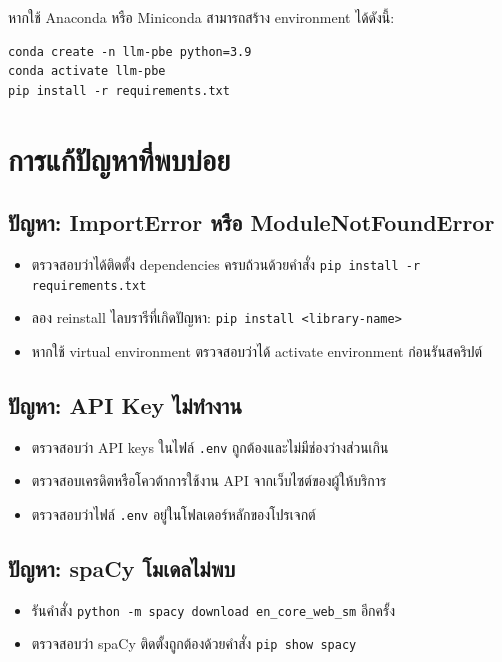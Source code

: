 หากใช้ Anaconda หรือ Miniconda สามารถสร้าง environment ได้ดังนี้:

\begin{lstlisting}[style=bash]
conda create -n llm-pbe python=3.9
conda activate llm-pbe
pip install -r requirements.txt
\end{lstlisting}

\section{การแก้ปัญหาที่พบบ่อย}
\label{sec:troubleshooting}

\subsection{ปัญหา: ImportError หรือ ModuleNotFoundError}

\begin{itemize}
    \item ตรวจสอบว่าได้ติดตั้ง dependencies ครบถ้วนด้วยคำสั่ง \texttt{pip install -r requirements.txt}
    \item ลอง reinstall ไลบรารีที่เกิดปัญหา: \texttt{pip install <library-name>}
    \item หากใช้ virtual environment ตรวจสอบว่าได้ activate environment ก่อนรันสคริปต์
\end{itemize}

\subsection{ปัญหา: API Key ไม่ทำงาน}

\begin{itemize}
    \item ตรวจสอบว่า API keys ในไฟล์ \texttt{.env} ถูกต้องและไม่มีช่องว่างส่วนเกิน
    \item ตรวจสอบเครดิตหรือโควต้าการใช้งาน API จากเว็บไซต์ของผู้ให้บริการ
    \item ตรวจสอบว่าไฟล์ \texttt{.env} อยู่ในโฟลเดอร์หลักของโปรเจกต์
\end{itemize}

\subsection{ปัญหา: spaCy โมเดลไม่พบ}

\begin{itemize}
    \item รันคำสั่ง \texttt{python -m spacy download en\_core\_web\_sm} อีกครั้ง
    \item ตรวจสอบว่า spaCy ติดตั้งถูกต้องด้วยคำสั่ง \texttt{pip show spacy}
\end{itemize}

